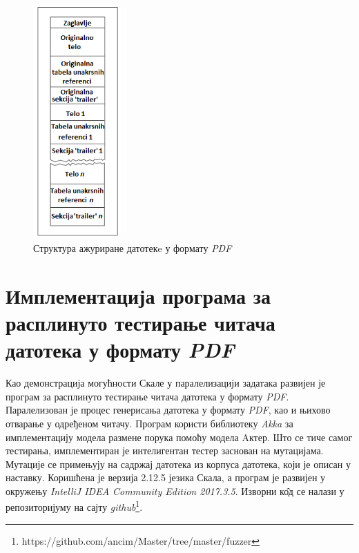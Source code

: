 \documentclass[12pt,oneside]{memoir}
\begin{document}
\begin{figure}[t!]
\centering
\includegraphics[width=0.3\textwidth]{pdfStruktura2.png}
\caption{Структура ажуриране датотекe у формату \textit{PDF}}
\label{fig:pdfStruktura2}
\end{figure}

\chapter{Имплементација програма за расплинуто тестирање читача датотека у формату \textit{PDF}}
\label{chp:implementacija}

Као демонстрација могућности Скале у паралелизацији задатака развијен је програм за расплинуто тестирање читача датотека у формату \textit{PDF}. Паралелизован је процес генерисања датотека у формату \textit{PDF}, као и њихово отварање у одређеном читачу. Програм користи библиотеку \textit{Akka} за имплементацију модела размене порука помоћу модела Aктер. Што се тиче самог тестирања, имплементиран је интелигентан тестер заснован на мутацијама. Мутације се примењују на садржај датотека из корпуса датотека, који је описан у наставку. Коришћена је верзија 2.12.5 језика Скала, а програм је развијен у окружењу \textit{IntelliJ IDEA Community Edition 2017.3.5}. Изворни к\^{о}д се налази у репозиторијуму на сајту \textit{github}\footnote{https://github.com/ancim/Master/tree/master/fuzzer}.
\end{document}
